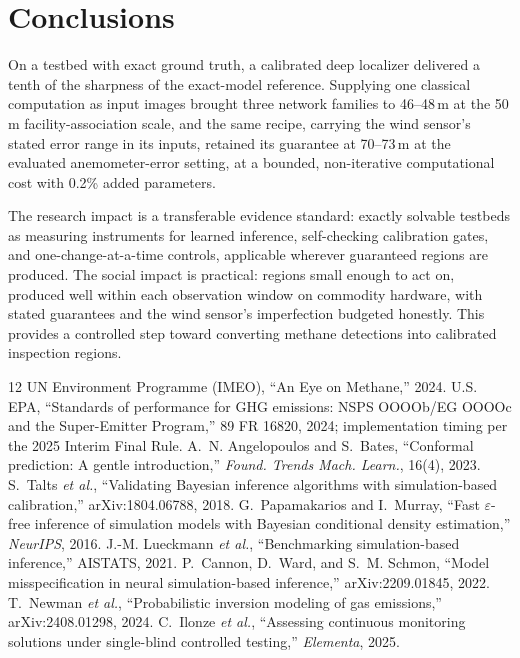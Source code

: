 \documentclass[conference]{IEEEtran}
\begin{document}
\section{Conclusions}
On a testbed with exact ground truth, a calibrated deep localizer
delivered a tenth of the sharpness of the exact-model reference.
Supplying one classical computation as input images brought three
network families to 46--48\,m at the 50\,m facility-association scale,
and the same recipe, carrying the wind sensor's stated error range in
its inputs, retained its guarantee at 70--73\,m at the evaluated
anemometer-error setting, at a bounded, non-iterative computational
cost with 0.2\% added parameters.

The research impact is a transferable evidence standard: exactly
solvable testbeds as measuring instruments for learned inference,
self-checking calibration gates, and one-change-at-a-time controls,
applicable wherever guaranteed regions are produced. The social impact
is practical: regions small enough to act on, produced well within
each observation window on commodity hardware, with stated guarantees and the wind sensor's
imperfection budgeted honestly. This provides a controlled step toward
converting methane detections into calibrated inspection regions.

{\footnotesize
\begin{thebibliography}{12}
 UN Environment Programme (IMEO), ``An Eye on
Methane,'' 2024.
 U.S. EPA, ``Standards of performance for GHG emissions:
NSPS OOOOb/EG OOOOc and the Super-Emitter Program,'' 89 FR 16820, 2024;
implementation timing per the 2025 Interim Final Rule.
 A.~N. Angelopoulos and S.~Bates, ``Conformal
prediction: A gentle introduction,'' \emph{Found. Trends Mach. Learn.},
16(4), 2023.
 S.~Talts \emph{et al.}, ``Validating Bayesian inference
algorithms with simulation-based calibration,'' arXiv:1804.06788, 2018.
 G.~Papamakarios and I.~Murray, ``Fast $\varepsilon$-free
inference of simulation models with Bayesian conditional density
estimation,'' \emph{NeurIPS}, 2016.
 J.-M. Lueckmann \emph{et al.}, ``Benchmarking
simulation-based inference,'' AISTATS, 2021.
 P.~Cannon, D.~Ward, and S.~M. Schmon, ``Model
misspecification in neural simulation-based inference,''
arXiv:2209.01845, 2022.
 T.~Newman \emph{et al.}, ``Probabilistic inversion
modeling of gas emissions,'' arXiv:2408.01298, 2024.
 C.~Ilonze \emph{et al.}, ``Assessing continuous
monitoring solutions under single-blind controlled testing,''
\emph{Elementa}, 2025.
\end{thebibliography}}
\end{document}
